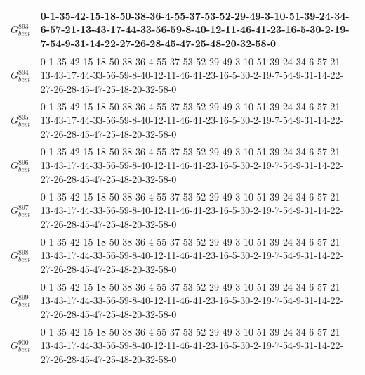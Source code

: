 \begin{landscape}
{\begin{tabularx}{\linewidth}{|c|X|}
        $G_{best}^{893}$ & 0-1-35-42-15-18-50-38-36-4-55-37-53-52-29-49-3-10-51-39-24-34-6-57-21-13-43-17-44-33-56-59-8-40-12-11-46-41-23-16-5-30-2-19-7-54-9-31-14-22-27-26-28-45-47-25-48-20-32-58-0 \\ \hline
        $G_{best}^{894}$ & 0-1-35-42-15-18-50-38-36-4-55-37-53-52-29-49-3-10-51-39-24-34-6-57-21-13-43-17-44-33-56-59-8-40-12-11-46-41-23-16-5-30-2-19-7-54-9-31-14-22-27-26-28-45-47-25-48-20-32-58-0 \\ \hline
        $G_{best}^{895}$ & 0-1-35-42-15-18-50-38-36-4-55-37-53-52-29-49-3-10-51-39-24-34-6-57-21-13-43-17-44-33-56-59-8-40-12-11-46-41-23-16-5-30-2-19-7-54-9-31-14-22-27-26-28-45-47-25-48-20-32-58-0 \\ \hline
        $G_{best}^{896}$ & 0-1-35-42-15-18-50-38-36-4-55-37-53-52-29-49-3-10-51-39-24-34-6-57-21-13-43-17-44-33-56-59-8-40-12-11-46-41-23-16-5-30-2-19-7-54-9-31-14-22-27-26-28-45-47-25-48-20-32-58-0 \\ \hline
        $G_{best}^{897}$ & 0-1-35-42-15-18-50-38-36-4-55-37-53-52-29-49-3-10-51-39-24-34-6-57-21-13-43-17-44-33-56-59-8-40-12-11-46-41-23-16-5-30-2-19-7-54-9-31-14-22-27-26-28-45-47-25-48-20-32-58-0 \\ \hline
        $G_{best}^{898}$ & 0-1-35-42-15-18-50-38-36-4-55-37-53-52-29-49-3-10-51-39-24-34-6-57-21-13-43-17-44-33-56-59-8-40-12-11-46-41-23-16-5-30-2-19-7-54-9-31-14-22-27-26-28-45-47-25-48-20-32-58-0 \\ \hline
        $G_{best}^{899}$ & 0-1-35-42-15-18-50-38-36-4-55-37-53-52-29-49-3-10-51-39-24-34-6-57-21-13-43-17-44-33-56-59-8-40-12-11-46-41-23-16-5-30-2-19-7-54-9-31-14-22-27-26-28-45-47-25-48-20-32-58-0 \\ \hline
        $G_{best}^{900}$ & 0-1-35-42-15-18-50-38-36-4-55-37-53-52-29-49-3-10-51-39-24-34-6-57-21-13-43-17-44-33-56-59-8-40-12-11-46-41-23-16-5-30-2-19-7-54-9-31-14-22-27-26-28-45-47-25-48-20-32-58-0 \\ \hline
    \end{tabularx}
    }

\end{landscape}
\pagebreak


